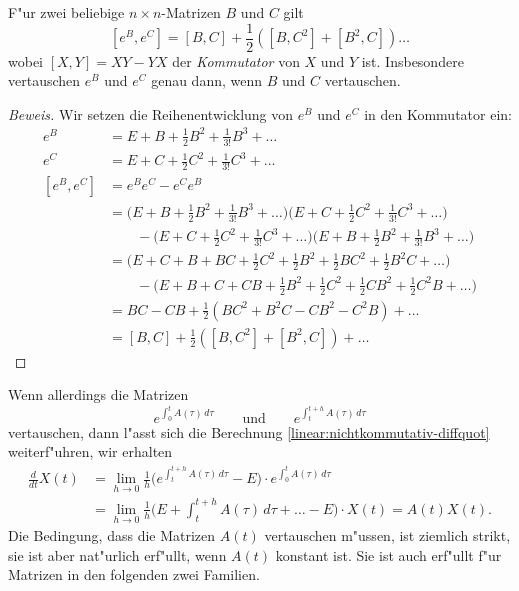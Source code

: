 \begin{satz}
%
F"ur zwei beliebige $n\times n$-Matrizen $B$ und $C$ gilt
\[
[e^B,e^C]=[B,C]+\frac12([B,C^2]+[B^2,C])\dots
\]
wobei $[X,Y]=XY-YX$ der {\em Kommutator} von $X$ und $Y$ ist.
%
Insbesondere vertauschen $e^B$ und $e^C$ genau dann, wenn $B$ und $C$
vertauschen.
\end{satz}

\begin{proof}[Beweis]
Wir setzen die Reihenentwicklung von $e^B$ und $e^C$ in den Kommutator
ein:
\begin{align*}
e^B
&=
E+B+\frac12B^2+\frac1{3!}B^3+\dots
\\
e^C
&=
E+C+\frac12C^2+\frac1{3!}C^3+\dots
\\
[e^B,e^C]
&=
e^Be^C-e^Ce^B
\\
&=
\biggl(E+B+\frac12B^2+\frac1{3!}B^3+\dots\biggr)
\biggl(E+C+\frac12C^2+\frac1{3!}C^3+\dots\biggr)
\\
&\qquad
-
\biggl(E+C+\frac12C^2+\frac1{3!}C^3+\dots\biggr)
\biggl(E+B+\frac12B^2+\frac1{3!}B^3+\dots\biggr)
\\
&=
\biggl(E+C+B+BC+\frac12C^2+\frac12B^2+\frac12BC^2+\frac12B^2C+\dots\biggr)
\\
&\qquad
-
\biggl(E+B+C+CB+\frac12B^2+\frac12C^2+\frac12CB^2+\frac12C^2B+\dots\biggr)
\\
&=
BC-CB+\frac12(BC^2+B^2C-CB^2-C^2B)+\dots
\\
&=[B,C]+\frac12([B,C^2]+[B^2,C])+\dots
\end{align*}
\end{proof}
Wenn allerdings die Matrizen
\[
e^{\int_0^tA(\tau)\,d\tau}
\qquad\text{und}\qquad
e^{\int_t^{t+h}A(\tau)\,d\tau}
\]
vertauschen, dann l"asst sich die Berechnung
\eqref{linear:nichtkommutativ-diffquot} weiterf"uhren, wir
erhalten
\begin{align*}
\frac{d}{dt}X(t)
&=
\lim_{h\to 0}\frac1h\biggl(
e^{\int_t^{t+h}A(\tau)\,d\tau}
-
E
\biggr)
\cdot
e^{\int_0^tA(\tau)\,d\tau}
\\
&=
\lim_{h\to0}\frac1h
\biggl(E+\int_t^{t+h}A(\tau)\,d\tau+\dots-E\biggr)\cdot X(t)
=A(t)X(t).
\end{align*}
Die Bedingung, dass die Matrizen $A(t)$ vertauschen m"ussen, ist
ziemlich strikt, sie ist aber nat"urlich erf"ullt, wenn $A(t)$
konstant ist.
Sie ist auch erf"ullt f"ur Matrizen in den folgenden zwei
Familien.
